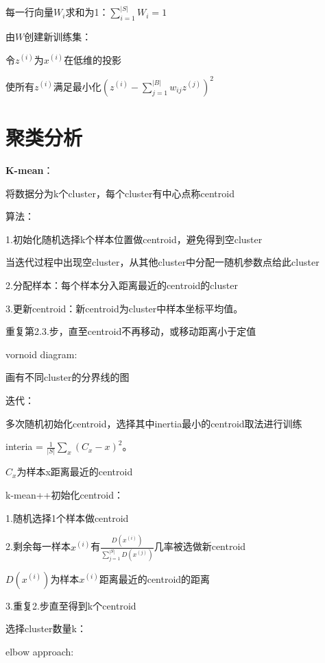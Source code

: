 \documentclass[UTF8]{ctexart}
\begin{document}
  \quad 每一行向量$W_i$求和为1：$\sum_{i=1}^{|S|}W_i = 1$

  由$W$创建新训练集：

  \quad 令$z^{(i)}$为$x^{(i)}$在低维的投影

  \quad 使所有$z^{(i)}$满足最小化$(z^{(i)} - \sum_{j=1}^{|B|}w_{ij}z^{(j)})^2$

\section{聚类分析}
\noindent \textbf{K-mean}：

  将数据分为k个cluster，每个cluster有中心点称centroid
  
  算法：
  
  \quad 1.初始化随机选择k个样本位置做centroid，避免得到空cluster

  \quad \quad 当迭代过程中出现空cluster，从其他cluster中分配一随机参数点给此cluster

  \quad 2.分配样本：每个样本分入距离最近的centroid的cluster

  \quad 3.更新centroid：新centroid为cluster中样本坐标平均值。
  
  \quad 重复第2.3.步，直至centroid不再移动，或移动距离小于定值

  vornoid diagram:

  \quad 画有不同cluster的分界线的图

  迭代：
  
  \quad 多次随机初始化centroid，选择其中inertia最小的centroid取法进行训练

  \quad \quad interia = $\frac{1}{|S|}\sum_x (C_x - x)^2$。

  \quad \quad \quad $C_x$为样本x距离最近的centroid

  \quad k-mean++初始化centroid：

  \quad \quad 1.随机选择1个样本做centroid

  \quad \quad 2.剩余每一样本$x^{(i)}$有$\frac{D(x^{(i)})}{\sum_{j=1}^{|S|} D(x^{(j)})}$几率被选做新centroid

  \quad \quad \quad $D(x^{(i)})$为样本$x^{(i)}$距离最近的centroid的距离

  \quad \quad 3.重复2.步直至得到k个centroid

  \quad 选择cluster数量k：
  
  \quad \quad elbow approach:
\end{document}
